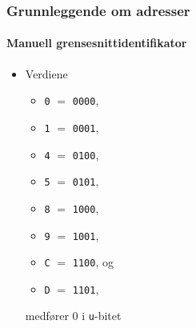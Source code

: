 \begin{frame}%
  \frametitle{Grunnleggende om adresser}
  \framesubtitle{Manuell grensesnittidentifikator}
  \begin{itemize}[<+->]
  \item Verdiene
    \begin{itemize}[<+->]
    \item \texttt{0} \(=\) \texttt{00\alert{0}0},
    \item \texttt{1} \(=\) \texttt{00\alert{0}1},
    \item \texttt{4} \(=\) \texttt{01\alert{0}0},
    \item \texttt{5} \(=\) \texttt{01\alert{0}1},
    \item \texttt{8} \(=\) \texttt{10\alert{0}0},
    \item \texttt{9} \(=\) \texttt{10\alert{0}1},
    \item \texttt{C} \(=\) \texttt{11\alert{0}0}, og
    \item \texttt{D} \(=\) \texttt{11\alert{0}1},
    \end{itemize}
    medfører \(0\) i \texttt{u}-bitet
  \end{itemize}
\end{frame}

